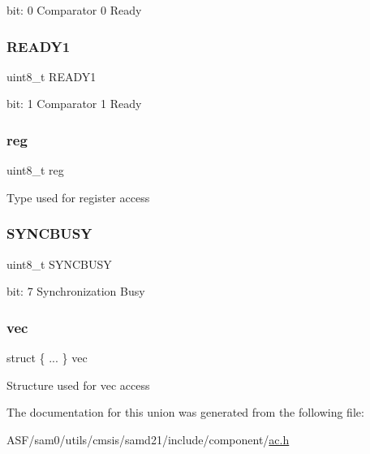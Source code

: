 bit\+: 0 Comparator 0 Ready \mbox{\label{union_a_c___s_t_a_t_u_s_b___type_a960615924a5af2e6165088391b19271c}} 
\subsubsection{\texorpdfstring{READY1}{READY1}}
{\footnotesize\ttfamily uint8\+\_\+t R\+E\+A\+D\+Y1}

bit\+: 1 Comparator 1 Ready \mbox{\label{union_a_c___s_t_a_t_u_s_b___type_a9428adc9af4653a2050e2536b55dec8d}} 
\subsubsection{\texorpdfstring{reg}{reg}}
{\footnotesize\ttfamily uint8\+\_\+t reg}

Type used for register access \mbox{\label{union_a_c___s_t_a_t_u_s_b___type_abb30254758e23bd24824e436a1aa8716}} 
\subsubsection{\texorpdfstring{SYNCBUSY}{SYNCBUSY}}
{\footnotesize\ttfamily uint8\+\_\+t S\+Y\+N\+C\+B\+U\+SY}

bit\+: 7 Synchronization Busy \mbox{\label{union_a_c___s_t_a_t_u_s_b___type_aea207f933470fb93821b99c2beabba83}} 
\subsubsection{\texorpdfstring{vec}{vec}}
{\footnotesize\ttfamily struct \{ ... \}   vec}

Structure used for vec access 

The documentation for this union was generated from the following file\+:\begin{DoxyCompactItemize}
\item 
A\+S\+F/sam0/utils/cmsis/samd21/include/component/\mbox{\hyperlink{component_2ac_8h}{ac.\+h}}\end{DoxyCompactItemize}
